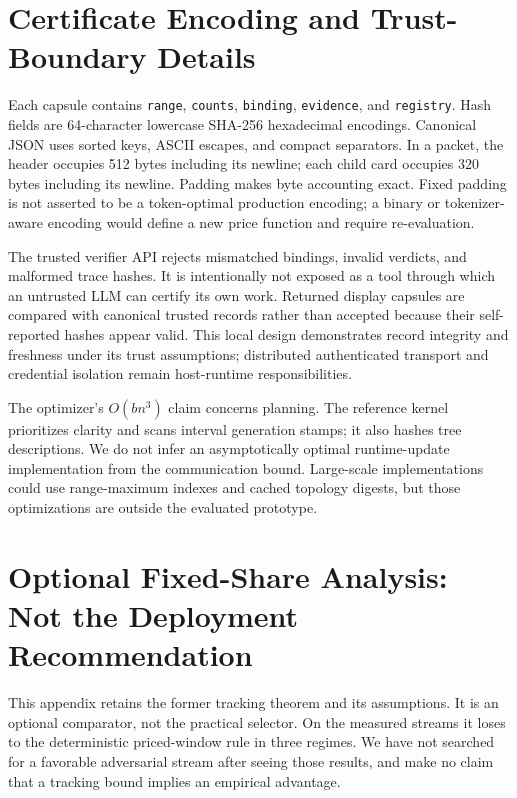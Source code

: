 \section{Certificate Encoding and Trust-Boundary Details}\label{app:encoding}
Each capsule contains \texttt{range}, \texttt{counts}, \texttt{binding},
\texttt{evidence}, and \texttt{registry}. Hash fields are 64-character lowercase
SHA-256 hexadecimal encodings. Canonical JSON uses sorted keys, ASCII escapes, and
compact separators. In a packet, the header occupies 512 bytes including its
newline; each child card occupies 320 bytes including its newline. Padding makes
byte accounting exact. Fixed padding is not asserted to be a token-optimal
production encoding; a binary or tokenizer-aware encoding would define a new price
function and require re-evaluation.

The trusted verifier API rejects mismatched bindings, invalid verdicts, and
malformed trace hashes. It is intentionally not exposed as a tool through which an
untrusted LLM can certify its own work. Returned display capsules are compared
with canonical trusted records rather than accepted because their self-reported
hashes appear valid. This local design demonstrates record integrity and freshness
under its trust assumptions; distributed authenticated transport and credential
isolation remain host-runtime responsibilities.

The optimizer's $O(bn^3)$ claim concerns planning. The reference kernel
prioritizes clarity and scans interval generation stamps; it also hashes tree
descriptions. We do not infer an asymptotically optimal runtime-update
implementation from the communication bound. Large-scale implementations could use
range-maximum indexes and cached topology digests, but those optimizations are
outside the evaluated prototype.

\section{Optional Fixed-Share Analysis: Not the Deployment Recommendation}\label{app:fixedshare}
This appendix retains the former tracking theorem and its assumptions. It is an
optional comparator, not the practical selector. On the measured streams it loses
to the deterministic priced-window rule in three regimes. We have not searched for
a favorable adversarial stream after seeing those results, and make no claim that a
tracking bound implies an empirical advantage.

